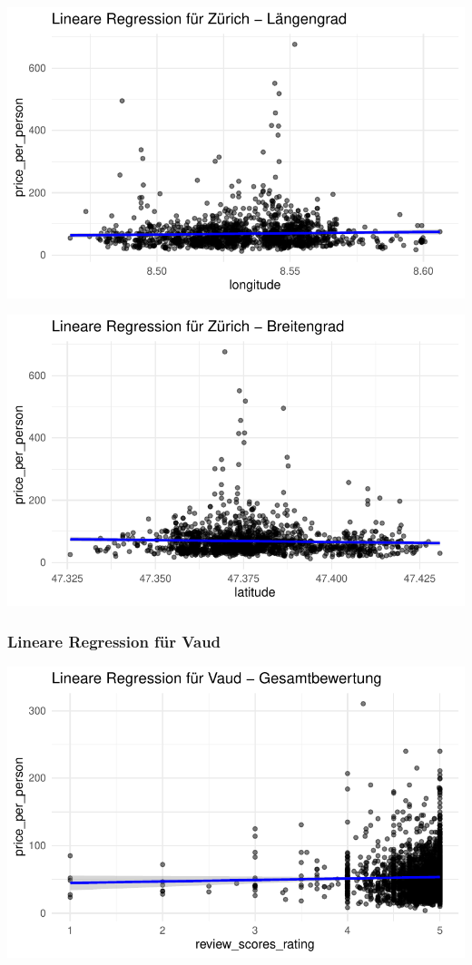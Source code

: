 \documentclass[
  journal,
]{IEEEtran}%
\begin{document}
\includegraphics{main_files/figure-pdf/unnamed-chunk-13-7.pdf}

\includegraphics{main_files/figure-pdf/unnamed-chunk-13-8.pdf}

\hypertarget{lineare-regression-fuxfcr-vaud}{%
\subsubsection{Lineare Regression für
Vaud}\label{lineare-regression-fuxfcr-vaud}}

\includegraphics{main_files/figure-pdf/unnamed-chunk-14-1.pdf}
\end{document}
